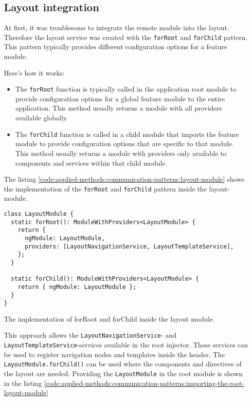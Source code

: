 \subsection{Layout integration}\label{subsection:applied-methods:communication-patterns:layout-integration}

At first, it was troublesome to integrate the remote module into the layout. Therefore the layout service was created with the \texttt{forRoot} and \texttt{forChild} pattern. This pattern typically provides different configuration options for a feature module.

\bigskip

\noindent Here's how it works:

\begin{itemize}
  \item The \texttt{forRoot} function is typically called in the application root module to provide configuration options for a global feature module to the entire application. This method usually returns a module with all providers available globally.
  \item The \texttt{forChild} function is called in a child module that imports the feature module to provide configuration options that are specific to that module. This method usually returns a module with providers only available to components and services within that child module.
\end{itemize}

\noindent The listing \ref{code:applied-methods:communication-patterns:layout-module} shows the implementation of the \texttt{forRoot} and \texttt{forChild} pattern inside the layout-module.

\ifshowListings
  \begin{listing}[H]
  \begin{verbatim}
class LayoutModule {
  static forRoot(): ModuleWithProviders<LayoutModule> {
    return {
      ngModule: LayoutModule,
      providers: [LayoutNavigationService, LayoutTemplateService],
    };
  }

  static forChild(): ModuleWithProviders<LayoutModule> {
    return { ngModule: LayoutModule };
  }
}
  \end{verbatim}
  \caption{The implementation of forRoot and forChild inside the layout module.}\label{code:applied-methods:communication-patterns:layout-module}
  \end{listing}
\fi

\noindent This approach allows the \texttt{LayoutNavigationService}- and \texttt{LayoutTemplateService}-services available in the root injector. These services can be used to register navigation nodes and templates inside the header. The \texttt{LayoutModule.forChild()} can be used where the components and directives of the layout are needed. Providing the \texttt{LayoutModule} in the root module is shown in the listing \ref{code:applied-methods:communication-patterns:importing-the-root-layout-module}

